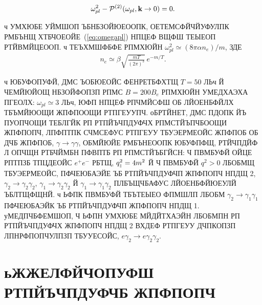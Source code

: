 \documentclass[koi8-r]{pazh2col}
\def\mprl{\mbox{\tiny $\|$}}
\begin{document}
%
\begin{equation}
\omega_{pl}^2 - {\cal P}^{(2)} (\omega_{pl}, {\mathbf k} \to 0 ) = 0.
\label{eq:omegapl}
\end{equation}

ч УМХЮБЕ УЙМШОП ЪБНБЗОЙЮЕООПК, ОЕТЕМСФЙЧЙУФУЛПК РМБЪНЩ ХТБЧОЕОЙЕ~(\ref{eq:omegapl}) НПЦЕФ 
ВЩФШ ТЕЫЕОП РТЙВМЙЦЕООП. ч ТЕЪХМШФБФЕ РПМХЮЙН $\omega_{pl}^2 \simeq (8\pi \alpha n_{e})/m$, 
ЗДЕ 
%
\begin{eqnarray}
n_{e} \simeq \beta \sqrt{\frac{mT}{(2\pi)^3}}\,e^{-m/T}.
\label{eq:ne}
\end{eqnarray}
  
ч ЮБУФОПУФЙ, ДМС ЪОБЮЕОЙС ФЕНРЕТБФХТЩ $T=50$ ЛЬч Й ЧЕМЙЮЙОЩ НБЗОЙФОПЗП РПМС $B=200 B_e$  РПМХЮЙН
УМЕДХАЭХА ПГЕОЛХ: $\omega_{pl} \simeq 3$ ЛЬч, ЮФП НПЦЕФ РПЧМЙСФШ ОБ ЛЙОЕНБФЙЛХ ТБЪМЙЮОЩИ ЖПФПООЩИ РТПГЕУУПЧ.  
оБРТЙНЕТ, ДМС ПДОПК ЙЪ ПУОПЧОЩИ ТЕБЛГЙК РП РТПЙЪЧПДУФЧХ РПМСТЙЪПЧБООЩИ ЖПФПОПЧ, ЛПФПТПК СЧМСЕФУС 
РТПГЕУУ ТБУЭЕРМЕОЙС ЖПФПОБ ОБ ДЧБ ЖПФПОБ, $\gamma \to \gamma \gamma$,  ОБМЙЮЙЕ  РМБЪНЕООПК 
ЮБУФПФЩ, РТЙЧПДЙФ Л ОПЧЩН РТБЧЙМБН ПФВПТБ РП РПМСТЙЪБГЙСН: Ч ПВМБУФЙ ОЙЦЕ РПТПЗБ ТПЦДЕОЙС 
$e^+e^-$ РБТЩ, $q^2_{\mprl} = 4 m^2$  Й Ч ПВМБУФЙ $q^2 > 0$ ЛБОБМЩ ТБУЭЕРМЕОЙС, ПФЧЕЮБАЭЙЕ 
ЪБ РТПЙЪЧПДУФЧП ЖПФПОПЧ НПДЩ 2,   
$\gamma_2 \to \gamma_2 \gamma_2$, 
$\gamma_1 \to \gamma_2 \gamma_2$ Й $\gamma_1 \to \gamma_1 \gamma_2$ ПЛБЪЩЧБАФУС 
ЛЙОЕНБФЙЮЕУЛЙ ЪБЛТЩФЩНЙ. ч ЬФПК ПВМБУФЙ ТБЪТЕЫЕО ФПМШЛП ЛБОБМ $\gamma_2 \to \gamma_1 \gamma_1$ 
ПФЧЕЮБАЭЙК ЪБ РТПЙЪЧПДУФЧП ЖПФПОПЧ НПДЩ 1.  уМЕДПЧБФЕМШОП, Ч ЬФПН УМХЮБЕ МЙДЙТХАЭЙН ЛБОБМПН РП РТПЙЪЧПДУФЧХ 
ЖПФПОПЧ НПДЩ 2 ВХДЕФ 
РТПГЕУУ ДЧПКОПЗП ЛПНРФПОПЧУЛПЗП ТБУУЕСОЙС, $e \gamma_2 \to e \gamma_2 \gamma_2$.

\section{ьЖЖЕЛФЙЧОПУФШ РТПЙЪЧПДУФЧБ ЖПФПОПЧ}
\end{document}
